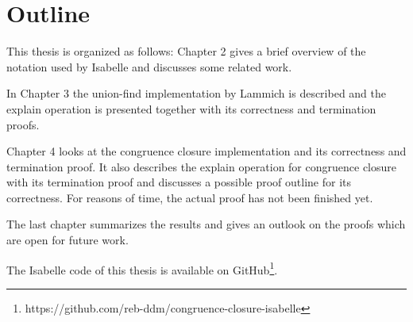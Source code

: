 \section{Outline}
This thesis is organized as follows: Chapter 2 gives a brief overview of the notation used by Isabelle and discusses some related work.

In Chapter 3 the union-find implementation by Lammich \cite{unionfind-isabelle} is described and the explain operation is presented together with its correctness and termination proofs.

Chapter 4 looks at the congruence closure implementation and its correctness and termination proof. It also describes the explain operation for congruence closure with its termination proof and discusses a possible proof outline for its correctness. For reasons of time, the actual proof has not been finished yet.

The last chapter summarizes the results and gives an outlook on the proofs which are open for future work.

The Isabelle code of this thesis is available on GitHub\footnote{https://github.com/reb-ddm/congruence-closure-isabelle}.


